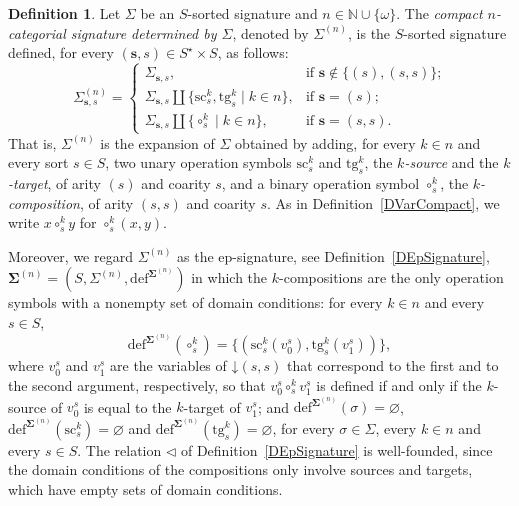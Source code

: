 \documentclass{amsart}
\newcommand{\vs}[1]{\mathbin{\downarrow}#1}
\theoremstyle{plain}
\theoremstyle{definition}
\newtheorem{definition}[theorem]{Definition}
\begin{document}
\begin{definition}\label{DSigmaCatCompact}
Let $\Sigma$ be an $S$-sorted signature and $n\in\mathbb{N}\cup\{\omega\}$. The \emph{compact $n$-categorial signature determined by $\Sigma$}, denoted by $\Sigma^{(n)}$, is the $S$-sorted signature defined, for every $(\mathbf{s},s)\in S^{\star}\times S$, as follows:
$$
{\Sigma}^{(n)}_{\mathbf{s},s}=
\begin{cases}
{\Sigma}_{\mathbf{s},s},
& \text{if $\mathbf{s}\not\in \{(s),(s,s)\}$;}\\
{\Sigma}_{\mathbf{s},s}\amalg\{\mathrm{sc}^{k}_{s}, \mathrm{tg}^{k}_{s}\mid k\in n\},
& \text{if $\mathbf{s}= (s)$;}\\
{\Sigma}_{\mathbf{s},s}\amalg\{\circ^{k}_{s}\mid k\in n\},
& \text{if $\mathbf{s}= (s,s)$.}
\end{cases}
$$
That is, ${\Sigma}^{(n)}$ is the expansion of $\Sigma$ obtained by adding, for every $k\in n$ and every sort $s\in S$, two unary operation symbols $\mathrm{sc}^{k}_{s}$ and $\mathrm{tg}^{k}_{s}$, the \emph{$k$-source} and the \emph{$k$-target}, of arity $(s)$ and coarity $s$, and a binary operation symbol $\circ^{k}_{s}$, the \emph{$k$-composition}, of arity $(s,s)$ and coarity $s$. As in Definition~\ref{DVarCompact}, we write $x\circ^{k}_{s}y$ for $\circ^{k}_{s}(x,y)$.

Moreover, we regard $\Sigma^{(n)}$ as the ep-signature, see Definition~\ref{DEpSignature}, $\mathbf{\Sigma}^{(n)}=(S,\Sigma^{(n)},\mathrm{def}^{\mathbf{\Sigma}^{(n)}})$ in which the $k$-compositions are the only operation symbols with a nonempty set of domain conditions: for every $k\in n$ and every $s\in S$,
$$
\mathrm{def}^{\mathbf{\Sigma}^{(n)}}(\circ^{k}_{s})=\{(\mathrm{sc}^{k}_{s}(v^{s}_{0}),\mathrm{tg}^{k}_{s}(v^{s}_{1}))\},
$$
where $v^{s}_{0}$ and $v^{s}_{1}$ are the variables of $\vs{(s,s)}$ that correspond to the first and to the second argument, respectively, so that $v^{s}_{0}\circ^{k}_{s}v^{s}_{1}$ is defined if and only if the $k$-source of $v^{s}_{0}$ is equal to the $k$-target of $v^{s}_{1}$; and $\mathrm{def}^{\mathbf{\Sigma}^{(n)}}(\sigma)=\varnothing$, $\mathrm{def}^{\mathbf{\Sigma}^{(n)}}(\mathrm{sc}^{k}_{s})=\varnothing$ and $\mathrm{def}^{\mathbf{\Sigma}^{(n)}}(\mathrm{tg}^{k}_{s})=\varnothing$, for every $\sigma\in\Sigma$, every $k\in n$ and every $s\in S$. The relation $\lhd$ of Definition~\ref{DEpSignature} is well-founded, since the domain conditions of the compositions only involve sources and targets, which have empty sets of domain conditions.
\end{definition}
\end{document}
